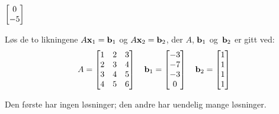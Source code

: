 \begin{losning}
$\begin{bmatrix} 0 \\ -5 \end{bmatrix}$
\end{losning}


\begin{oppgave}
Løs de to likningene
$A\mathbf{x}_1=\mathbf{b}_1$  og $A\mathbf{x}_2=\mathbf{b}_2$,
der $A$, $\mathbf{b}_1$ og~$\mathbf{b}_2$ er gitt ved:
\[
A=\begin{bmatrix}
	1 & 2 & 3\\
	2 & 3 & 4\\
	3 & 4 & 5\\
	4 & 5 & 6
	\end{bmatrix}
\quad
\mathbf{b}_1=
	\begin{bmatrix}
	-3  \\
	-7 \\
	-3 \\
	0
	\end{bmatrix}
\quad
\mathbf{b}_2=
	\begin{bmatrix}
	1  \\
	1 \\
	1 \\
	1
	\end{bmatrix}
\]
\end{oppgave}


\begin{losning}
Den første har ingen løsninger; den andre har uendelig mange løsninger.
\end{losning}



